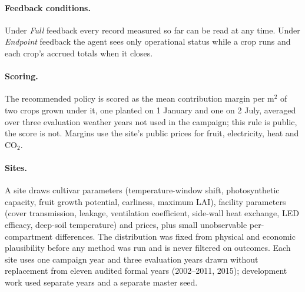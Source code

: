 \paragraph{Feedback conditions.} Under \emph{Full} feedback every record measured so far can be read at any time. Under \emph{Endpoint} feedback the agent sees only operational status while a crop runs and each crop's accrued totals when it closes.

\paragraph{Scoring.} The recommended policy is scored as the mean contribution margin per m$^2$ of two crops grown under it, one planted on 1 January and one on 2 July, averaged over three evaluation weather years not used in the campaign; this rule is public, the score is not. Margins use the site's public prices for fruit, electricity, heat and CO$_2$.

\paragraph{Sites.} A site draws cultivar parameters (temperature-window shift, photosynthetic capacity, fruit growth potential, earliness, maximum LAI), facility parameters (cover transmission, leakage, ventilation coefficient, side-wall heat exchange, LED efficacy, deep-soil temperature) and prices, plus small unobservable per-compartment differences. The distribution was fixed from physical and economic plausibility before any method was run and is never filtered on outcomes. Each site uses one campaign year and three evaluation years drawn without replacement from eleven audited formal years (2002--2011, 2015); development work used separate years and a separate master seed.
